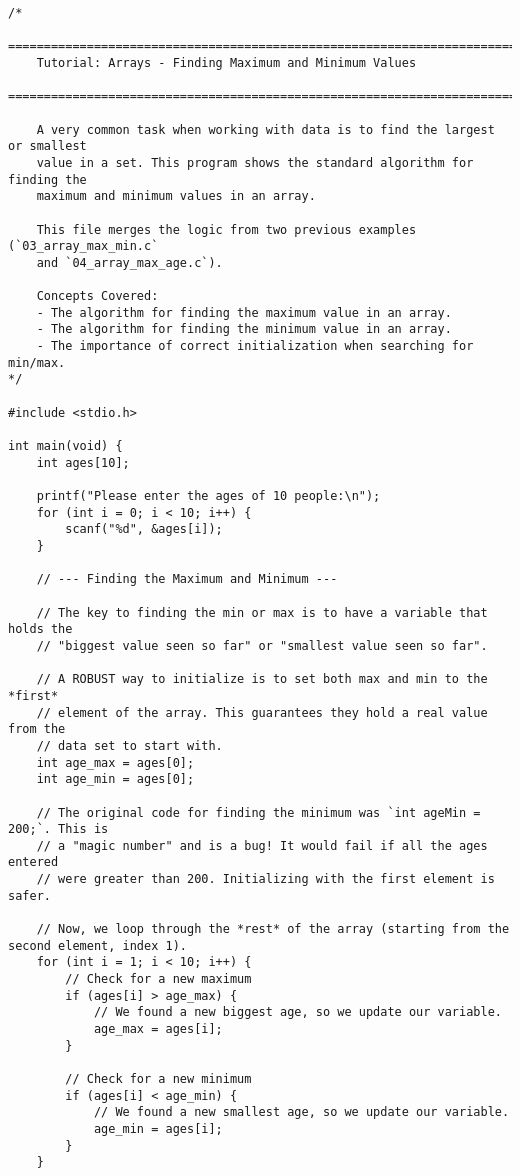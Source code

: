 \documentclass[11pt]{book}
\begin{document}
\begin{verbatim}
/*
    ================================================================================
    Tutorial: Arrays - Finding Maximum and Minimum Values
    ================================================================================

    A very common task when working with data is to find the largest or smallest
    value in a set. This program shows the standard algorithm for finding the
    maximum and minimum values in an array.

    This file merges the logic from two previous examples (`03_array_max_min.c`
    and `04_array_max_age.c`).

    Concepts Covered:
    - The algorithm for finding the maximum value in an array.
    - The algorithm for finding the minimum value in an array.
    - The importance of correct initialization when searching for min/max.
*/

#include <stdio.h>

int main(void) {
    int ages[10];

    printf("Please enter the ages of 10 people:\n");
    for (int i = 0; i < 10; i++) {
        scanf("%d", &ages[i]);
    }

    // --- Finding the Maximum and Minimum ---

    // The key to finding the min or max is to have a variable that holds the
    // "biggest value seen so far" or "smallest value seen so far".

    // A ROBUST way to initialize is to set both max and min to the *first*
    // element of the array. This guarantees they hold a real value from the
    // data set to start with.
    int age_max = ages[0];
    int age_min = ages[0];

    // The original code for finding the minimum was `int ageMin = 200;`. This is
    // a "magic number" and is a bug! It would fail if all the ages entered
    // were greater than 200. Initializing with the first element is safer.

    // Now, we loop through the *rest* of the array (starting from the second element, index 1).
    for (int i = 1; i < 10; i++) {
        // Check for a new maximum
        if (ages[i] > age_max) {
            // We found a new biggest age, so we update our variable.
            age_max = ages[i];
        }

        // Check for a new minimum
        if (ages[i] < age_min) {
            // We found a new smallest age, so we update our variable.
            age_min = ages[i];
        }
    }


\end{verbatim}
\end{document}
